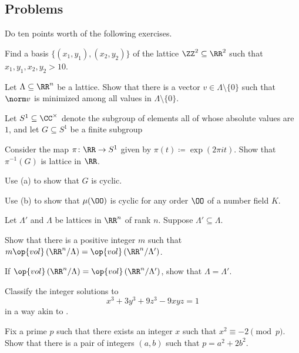 \documentclass[../notes.tex]{subfiles}
\begin{document}
\subsection{Problems}
Do ten points worth of the following exercises.
\begin{prob}[1 point]
	Find a basis $\{(x_1,y_1),(x_2,y_2)\}$ of the lattice $\ZZ^2\subseteq\RR^2$ such that $x_1,y_1,x_2,y_2>10$.
\end{prob}
\begin{prob}[2 points]
	Let $\Lambda\subseteq\RR^n$ be a lattice. Show that there is a vector $v\in\Lambda\setminus\{0\}$ such that $\norm v$ is minimized among all values in $\Lambda\setminus\{0\}$.
\end{prob}
\begin{prob}[3 points]
	Let $S^1\subseteq\CC^\times$ denote the subgroup of elements all of whose absolute values are $1$, and let $G\subseteq S^1$ be a finite subgroup 
	\begin{listalph}
		\item Consider the map $\pi\colon\RR\to S^1$ given by $\pi(t)\coloneqq\exp(2\pi it)$. Show that $\pi^{-1}(G)$ is lattice in $\RR$.
		\item Use (a) to show that $G$ is cyclic.
		\item Use (b) to show that $\mu(\OO)$ is cyclic for any order $\OO$ of a number field $K$.
	\end{listalph}
\end{prob}
\begin{prob}[3 points]
	Let $\Lambda'$ and $\Lambda$ be lattices in $\RR^n$ of rank $n$. Suppose $\Lambda'\subseteq\Lambda$.
	\begin{listalph}
		\item Show that there is a positive integer $m$ such that $m\op{vol}\left(\RR^n/\Lambda\right)=\op{vol}\left(\RR^n/\Lambda'\right)$.
		\item If $\op{vol}\left(\RR^n/\Lambda\right)=\op{vol}\left(\RR^n/\Lambda'\right)$, show that $\Lambda=\Lambda'$.
	\end{listalph}
\end{prob}
\begin{prob}[4 points]
	Classify the integer solutions to
	\[x^3+3y^3+9z^3-9xyz=1\]
	in a way akin to .
\end{prob}
\begin{prob}[4 points]
	Fix a prime $p$ such that there exists an integer $x$ such that $x^2\equiv-2\pmod p$. Show that there is a pair of integers $(a,b)$ such that $p=a^2+2b^2$.
\end{prob}
\end{document}

